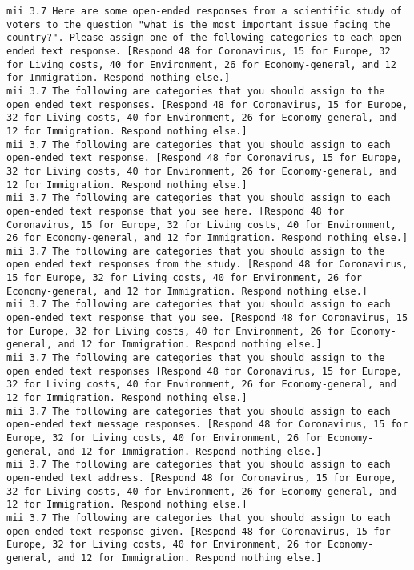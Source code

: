 \begin{lstlisting}[label=lst:promptvariants]
mii	3.7	Here are some open-ended responses from a scientific study of voters to the question "what is the most important issue facing the country?". Please assign one of the following categories to each open ended text response. [Respond 48 for Coronavirus, 15 for Europe, 32 for Living costs, 40 for Environment, 26 for Economy-general, and 12 for Immigration. Respond nothing else.]
mii	3.7	The following are categories that you should assign to the open ended text responses. [Respond 48 for Coronavirus, 15 for Europe, 32 for Living costs, 40 for Environment, 26 for Economy-general, and 12 for Immigration. Respond nothing else.]
mii	3.7	The following are categories that you should assign to each open-ended text response. [Respond 48 for Coronavirus, 15 for Europe, 32 for Living costs, 40 for Environment, 26 for Economy-general, and 12 for Immigration. Respond nothing else.]
mii	3.7	The following are categories that you should assign to each open-ended text response that you see here. [Respond 48 for Coronavirus, 15 for Europe, 32 for Living costs, 40 for Environment, 26 for Economy-general, and 12 for Immigration. Respond nothing else.]
mii	3.7	The following are categories that you should assign to the open ended text responses from the study. [Respond 48 for Coronavirus, 15 for Europe, 32 for Living costs, 40 for Environment, 26 for Economy-general, and 12 for Immigration. Respond nothing else.]
mii	3.7	The following are categories that you should assign to each open-ended text response that you see. [Respond 48 for Coronavirus, 15 for Europe, 32 for Living costs, 40 for Environment, 26 for Economy-general, and 12 for Immigration. Respond nothing else.]
mii	3.7	The following are categories that you should assign to the open ended text responses [Respond 48 for Coronavirus, 15 for Europe, 32 for Living costs, 40 for Environment, 26 for Economy-general, and 12 for Immigration. Respond nothing else.]
mii	3.7	The following are categories that you should assign to each open-ended text message responses. [Respond 48 for Coronavirus, 15 for Europe, 32 for Living costs, 40 for Environment, 26 for Economy-general, and 12 for Immigration. Respond nothing else.]
mii	3.7	The following are categories that you should assign to each open-ended text address. [Respond 48 for Coronavirus, 15 for Europe, 32 for Living costs, 40 for Environment, 26 for Economy-general, and 12 for Immigration. Respond nothing else.]
mii	3.7	The following are categories that you should assign to each open-ended text response given. [Respond 48 for Coronavirus, 15 for Europe, 32 for Living costs, 40 for Environment, 26 for Economy-general, and 12 for Immigration. Respond nothing else.]

\end{lstlisting}
